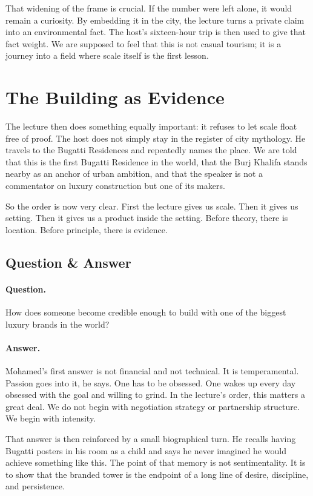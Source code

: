 That widening of the frame is crucial. If the number were left alone, it would remain a curiosity. By embedding it in the city, the lecture turns a private claim into an environmental fact. The host's sixteen-hour trip is then used to give that fact weight. We are supposed to feel that this is not casual tourism; it is a journey into a field where scale itself is the first lesson.

\section{The Building as Evidence}

The lecture then does something equally important: it refuses to let scale float free of proof. The host does not simply stay in the register of city mythology. He travels to the Bugatti Residences and repeatedly names the place. We are told that this is the first Bugatti Residence in the world, that the Burj Khalifa stands nearby as an anchor of urban ambition, and that the speaker is not a commentator on luxury construction but one of its makers.

So the order is now very clear. First the lecture gives us scale. Then it gives us setting. Then it gives us a product inside the setting. Before theory, there is location. Before principle, there is evidence.

\subsection{Question \& Answer}

\paragraph{Question.} How does someone become credible enough to build with one of the biggest luxury brands in the world?

\paragraph{Answer.} Mohamed's first answer is not financial and not technical. It is temperamental. Passion goes into it, he says. One has to be obsessed. One wakes up every day obsessed with the goal and willing to grind. In the lecture's order, this matters a great deal. We do not begin with negotiation strategy or partnership structure. We begin with intensity.

That answer is then reinforced by a small biographical turn. He recalls having Bugatti posters in his room as a child and says he never imagined he would achieve something like this. The point of that memory is not sentimentality. It is to show that the branded tower is the endpoint of a long line of desire, discipline, and persistence.

